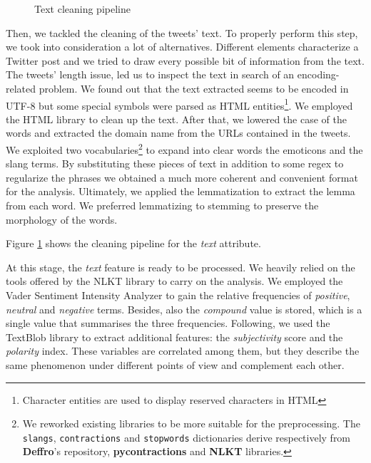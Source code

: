 \documentclass[conference]{IEEEtran}
\begin{document}
\begin{figure}[h]
        \centering
        
        \caption{Text cleaning pipeline}
        \label{fig:cleaning_schema}
\end{figure}
Then, we tackled the cleaning of the tweets' text. To properly perform this step, we took into consideration a lot of alternatives. Different elements characterize a Twitter post and we tried to draw every possible bit of information from the text. The tweets' length issue, led us to inspect the text in search of an encoding-related problem. We found out that the text extracted seems to be encoded in UTF-8\cite{utf8} but some special symbols were parsed as HTML entities\footnote{Character entities are used to display reserved characters in HTML}. We employed the HTML library to clean up the text. After that, we lowered the case of the words and extracted the domain name from the URLs contained in the tweets. We exploited two vocabularies\footnote{{We reworked existing libraries to be more suitable for the preprocessing. The \texttt{slangs}, \texttt{contractions} and \texttt{stopwords} dictionaries derive respectively from \textbf{Deffro}'s repository\cite{deffro}, \textbf{pycontractions} and \textbf{NLKT} libraries.}} to expand into clear words the emoticons and the slang terms. By substituting these pieces of text in addition to some regex to regularize the phrases we obtained a much more coherent and convenient format for the analysis. Ultimately, we applied the lemmatization\cite{lemmatization} to extract the lemma from each word. We preferred lemmatizing to stemming\cite{stemming} to preserve the morphology of the words\cite{stemmingVSlemmatizing}.

Figure \ref{fig:cleaning_schema} shows the cleaning pipeline for the \textit{text} attribute.

At this stage, the \textit{text} feature is ready to be processed. We heavily relied on the tools offered by the NLKT library\cite{nlkt} to carry on the analysis. We employed the Vader Sentiment Intensity Analyzer\cite{vader} to gain the relative frequencies of \textit{positive}, \textit{neutral} and \textit{negative} terms. Besides, also the \textit{compound} value is stored, which is a single value that summarises the three frequencies. Following, we used the TextBlob library\cite{textblob} to extract additional features: the \textit{subjectivity} score and the \textit{polarity} index. These variables are correlated among them, but they describe the same phenomenon under different points of view and complement each other.
\end{document}
